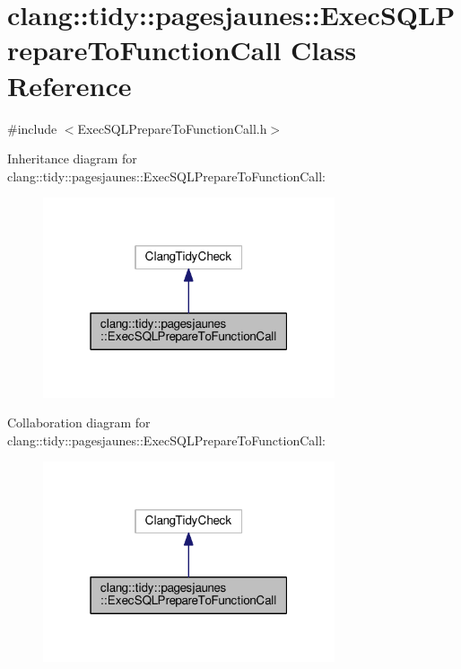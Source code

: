 \hypertarget{classclang_1_1tidy_1_1pagesjaunes_1_1_exec_s_q_l_prepare_to_function_call}{}\section{clang\+:\+:tidy\+:\+:pagesjaunes\+:\+:Exec\+S\+Q\+L\+Prepare\+To\+Function\+Call Class Reference}
\label{classclang_1_1tidy_1_1pagesjaunes_1_1_exec_s_q_l_prepare_to_function_call}


{\ttfamily \#include $<$Exec\+S\+Q\+L\+Prepare\+To\+Function\+Call.\+h$>$}



Inheritance diagram for clang\+:\+:tidy\+:\+:pagesjaunes\+:\+:Exec\+S\+Q\+L\+Prepare\+To\+Function\+Call\+:
\nopagebreak
\begin{figure}[H]
\begin{center}
\leavevmode
\includegraphics[width=244pt]{classclang_1_1tidy_1_1pagesjaunes_1_1_exec_s_q_l_prepare_to_function_call__inherit__graph}
\end{center}
\end{figure}


Collaboration diagram for clang\+:\+:tidy\+:\+:pagesjaunes\+:\+:Exec\+S\+Q\+L\+Prepare\+To\+Function\+Call\+:
\nopagebreak
\begin{figure}[H]
\begin{center}
\leavevmode
\includegraphics[width=244pt]{classclang_1_1tidy_1_1pagesjaunes_1_1_exec_s_q_l_prepare_to_function_call__coll__graph}
\end{center}
\end{figure}
